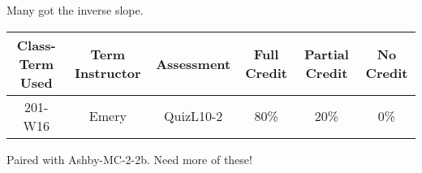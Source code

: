 \begin{outcomes}
Many got the inverse slope.

	\begin{center}
		\begin{tabular}{ccc|ccc}
			\hline\hline
			Class-Term Used & Term Instructor & Assessment & Full Credit & Partial Credit & No Credit\\
			\hline
			201-W16 & Emery & QuizL10-2 & 80\% & 20\% & 0\%\\    %
		\end{tabular}
	\end{center}
\end{outcomes}

\begin{comments}

Paired with Ashby-MC-2-2b. Need more of these!

\end{comments}